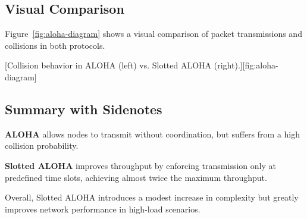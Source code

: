 \documentclass[../../../OAE-SPEC-MAIN.tex]{subfiles}
\begin{document}

\subsection{Visual Comparison}

Figure~\ref{fig:aloha-diagram} shows a visual comparison of packet transmissions and collisions in both protocols.

[Collision behavior in ALOHA (left) vs. Slotted ALOHA (right).][fig:aloha-diagram]


\subsection{Summary with Sidenotes}

\textbf{ALOHA} allows nodes to transmit without coordination, but suffers from a high collision probability.

\textbf{Slotted ALOHA} improves throughput by enforcing transmission only at predefined time slots, achieving almost twice the maximum throughput.

Overall, Slotted ALOHA introduces a modest increase in complexity but greatly improves network performance in high-load scenarios.
\end{document}
